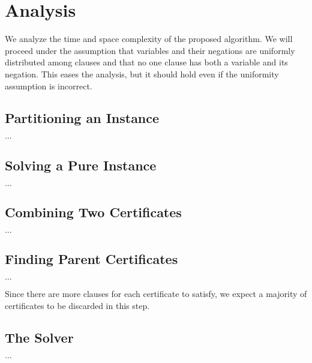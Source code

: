 \section{Analysis}
\label{sec:analysis}

We analyze the time and space complexity of the proposed algorithm.
We will proceed under the assumption that variables and their negations are uniformly distributed among clauses and that no one clause has both a variable and its negation.
This eases the analysis, but it should hold even if the uniformity assumption is incorrect.


\subsection{Partitioning an Instance}
\label{subsec:partitioning-an-instance-analysis}

$\dots$


\subsection{Solving a Pure Instance}
\label{subsec:solving-a-pure-instance-analysis}

$\dots$


\subsection{Combining Two Certificates}
\label{subsec:combining-two-certificates-analysis}

$\dots$


\subsection{Finding Parent Certificates}
\label{subsec:finding-parent-certificates2}

$\dots$

Since there are more clauses for each certificate to satisfy, we expect a majority of certificates to be discarded in this step.


\subsection{The Solver}
\label{subsec:the-solver-analysis}

$\dots$

